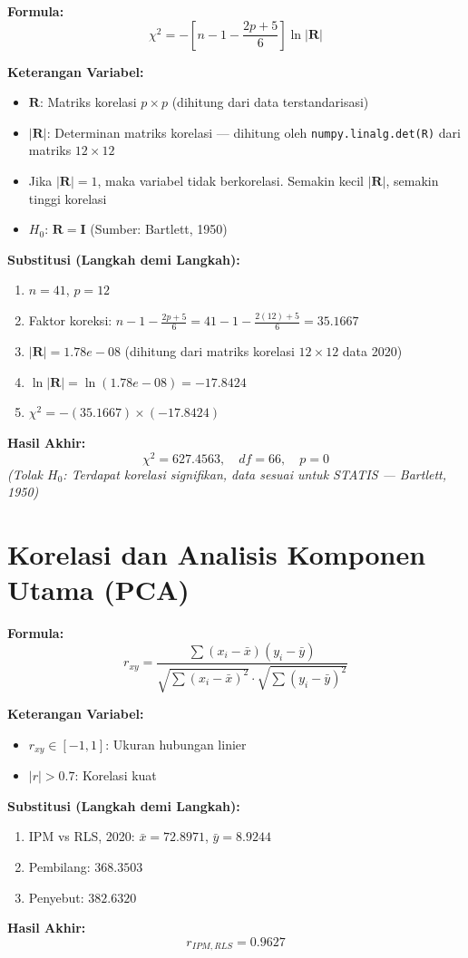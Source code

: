 \documentclass[11pt,a4paper]{article}
\begin{document}
\begin{tcolorbox}[formula_box, title={12. Uji Bartlett's Test of Sphericity ($\chi^2$)}]
\textbf{Formula:}
\[ \chi^2 = -\left[n - 1 - \frac{2p+5}{6}\right] \ln|\mathbf{R}| \]

\textbf{Keterangan Variabel:}
\begin{itemize}
  \item $\mathbf{R}$: Matriks korelasi $p \times p$ (dihitung dari data terstandarisasi)
  \item $|\mathbf{R}|$: Determinan matriks korelasi --- dihitung oleh \texttt{numpy.linalg.det(R)} dari matriks $12 \times 12$
  \item Jika $|\mathbf{R}| = 1$, maka variabel tidak berkorelasi. Semakin kecil $|\mathbf{R}|$, semakin tinggi korelasi
  \item $H_0$: $\mathbf{R} = \mathbf{I}$ (Sumber: Bartlett, 1950)
\end{itemize}

\textbf{Substitusi (Langkah demi Langkah):}
\begin{enumerate}
  \item $n = 41$, $p = 12$
  \item Faktor koreksi: $n-1-\frac{2p+5}{6} = 41-1-\frac{2(12)+5}{6} = 35.1667$
  \item $|\mathbf{R}| = 1.78e-08$ (dihitung dari matriks korelasi $12\times12$ data 2020)
  \item $\ln|\mathbf{R}| = \ln(1.78e-08) = -17.8424$
  \item $\chi^2 = -(35.1667) \times (-17.8424)$
\end{enumerate}

\textbf{Hasil Akhir:}
\[ \chi^2 = 627.4563, \quad df = 66, \quad p = 0 \]
\textit{(Tolak $H_0$: Terdapat korelasi signifikan, data sesuai untuk STATIS --- Bartlett, 1950)}
\end{tcolorbox}


\section{Korelasi dan Analisis Komponen Utama (PCA)}
\begin{tcolorbox}[formula_box, title={21. Korelasi Pearson ($r_{xy}$)}]
\textbf{Formula:}
\[ r_{xy} = \frac{\sum(x_i-\bar{x})(y_i-\bar{y})}{\sqrt{\sum(x_i-\bar{x})^2}\cdot\sqrt{\sum(y_i-\bar{y})^2}} \]

\textbf{Keterangan Variabel:}
\begin{itemize}
  \item $r_{xy}\in[-1,1]$: Ukuran hubungan linier
  \item $|r|>0.7$: Korelasi kuat
\end{itemize}

\textbf{Substitusi (Langkah demi Langkah):}
\begin{enumerate}
  \item IPM vs RLS, 2020: $\bar{x}=72.8971$, $\bar{y}=8.9244$
  \item Pembilang: $368.3503$
  \item Penyebut: $382.6320$
\end{enumerate}

\textbf{Hasil Akhir:}
\[ r_{IPM,RLS} = 0.9627 \]
\end{tcolorbox}
\end{document}
